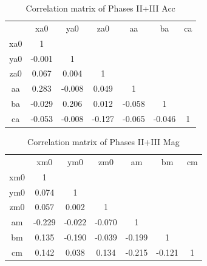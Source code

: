 \begin{table}
    \centering
    \begin{tabular}{c|c|c|c|c|c|c}
             &   xa0  &   ya0  &   za0  &   aa   &   ba   & ca \\
         xa0 &  1     &        &        &        &        &    \\
         ya0 & -0.001 &  1     &        &        &        &    \\
         za0 &  0.067 &  0.004 &  1     &        &        &    \\
         aa  &  0.283 & -0.008 &  0.049 &  1     &        &    \\
         ba  & -0.029 &  0.206 &  0.012 & -0.058 &  1     &    \\
         ca  & -0.053 & -0.008 & -0.127 & -0.065 & -0.046 &  1 \\
    \end{tabular}
    \caption{Correlation matrix of Phases II+III Acc}
    \label{tab:my_label}
\end{table}

\begin{table}
    \centering
    \begin{tabular}{c|c|c|c|c|c|c}
             &   xm0  & ym0    &   zm0  &   am   &   bm   & cm \\
         xm0 &  1     &        &        &        &        &    \\
         ym0 &  0.074 &  1     &        &        &        &    \\
         zm0 &  0.057 &  0.002 &  1     &        &        &    \\
         am  & -0.229 & -0.022 & -0.070 &  1     &        &    \\
         bm  &  0.135 & -0.190 & -0.039 & -0.199 &  1     &    \\
         cm  &  0.142 &  0.038 &  0.134 & -0.215 & -0.121 & 1  \\
    \end{tabular}
    \caption{Correlation matrix of Phases II+III Mag}
    \label{tab:my_label}
\end{table}




